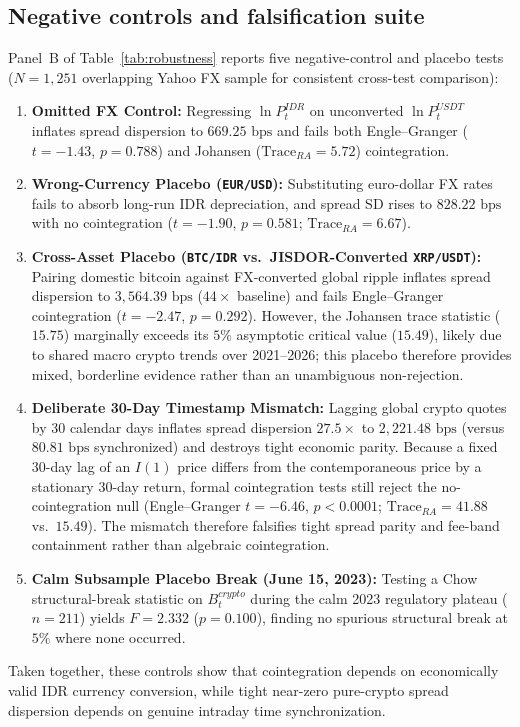 \subsection{Negative controls and falsification suite}
Panel~B of Table~\ref{tab:robustness} reports five negative-control and placebo tests ($N = 1,251$ overlapping Yahoo FX sample for consistent cross-test comparison):
\begin{enumerate}
  \item \textbf{Omitted FX Control:} Regressing $\ln P_t^{IDR}$ on unconverted $\ln P_t^{USDT}$ inflates spread dispersion to $669.25\text{ bps}$ and fails both Engle--Granger ($t = -1.43$, $p = 0.788$) and Johansen ($\text{Trace}_{RA} = 5.72$) cointegration.
  \item \textbf{Wrong-Currency Placebo (\texttt{EUR/USD}):} Substituting euro-dollar FX rates fails to absorb long-run IDR depreciation, and spread SD rises to $828.22\text{ bps}$ with no cointegration ($t = -1.90$, $p = 0.581$; $\text{Trace}_{RA} = 6.67$).
  \item \textbf{Cross-Asset Placebo (\texttt{BTC/IDR} vs.\ JISDOR-Converted \texttt{XRP/USDT}):} Pairing domestic bitcoin against FX-converted global ripple inflates spread dispersion to $3,564.39\text{ bps}$ ($44\times$ baseline) and fails Engle--Granger cointegration ($t = -2.47$, $p = 0.292$). However, the Johansen trace statistic ($15.75$) marginally exceeds its $5\%$ asymptotic critical value ($15.49$), likely due to shared macro crypto trends over 2021--2026; this placebo therefore provides mixed, borderline evidence rather than an unambiguous non-rejection.
  \item \textbf{Deliberate 30-Day Timestamp Mismatch:} Lagging global crypto quotes by 30 calendar days inflates spread dispersion $27.5\times$ to $2,221.48\text{ bps}$ (versus $80.81\text{ bps}$ synchronized) and destroys tight economic parity. Because a fixed 30-day lag of an $I(1)$ price differs from the contemporaneous price by a stationary 30-day return, formal cointegration tests still reject the no-cointegration null (Engle--Granger $t = -6.46$, $p < 0.0001$; $\text{Trace}_{RA} = 41.88$ vs.\ $15.49$). The mismatch therefore falsifies tight spread parity and fee-band containment rather than algebraic cointegration.
  \item \textbf{Calm Subsample Placebo Break (June 15, 2023):} Testing a Chow structural-break statistic on $B_t^{crypto}$ during the calm 2023 regulatory plateau ($n = 211$) yields $F = 2.332$ ($p = 0.100$), finding no spurious structural break at $5\%$ where none occurred.
\end{enumerate}
Taken together, these controls show that cointegration depends on economically valid IDR currency conversion, while tight near-zero pure-crypto spread dispersion depends on genuine intraday time synchronization.
